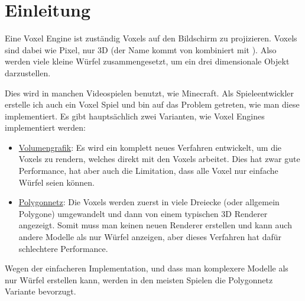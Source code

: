\section{Einleitung}

Eine Voxel Engine ist zuständig Voxels auf den
Bildschirm zu projizieren. Voxels sind dabei wie
Pixel, nur 3D (der Name  kommt von
 kombiniert mit ).
Also werden viele kleine Würfel zusammengesetzt,
um ein drei dimensionale Objekt darzustellen.

Dies wird in manchen Videospielen benutzt, wie
Minecraft. Als Spieleentwickler erstelle ich auch
ein Voxel Spiel und bin auf das Problem getreten,
wie man diese implementiert.
Es gibt hauptsächlich zwei Varianten,
wie Voxel Engines implementiert werden:

\begin{itemize}
	\item \href{https://de.wikipedia.org/wiki/Volumengrafik}{Volumengrafik}:
	Es wird ein komplett neues Verfahren entwickelt,
	um die Voxels zu rendern, welches direkt mit
	den Voxels arbeitet. Dies hat zwar gute
	Performance, hat aber auch die Limitation,
	dass alle Voxel nur einfache Würfel seien können.

	\item \href{https://de.wikipedia.org/wiki/Polygonnetz}{Polygonnetz}:
	Die Voxels werden zuerst in viele
	Dreiecke (oder allgemein Polygone) umgewandelt
	und dann von einem typischen 3D Renderer angezeigt.
	Somit muss man keinen neuen Renderer erstellen und
	kann auch andere Modelle als nur Würfel anzeigen,
	aber dieses Verfahren hat dafür schlechtere
	Performance.
\end{itemize}

Wegen der einfacheren Implementation, und dass man
komplexere Modelle als nur Würfel erstellen kann,
werden in den meisten Spielen die Polygonnetz
Variante bevorzugt.

